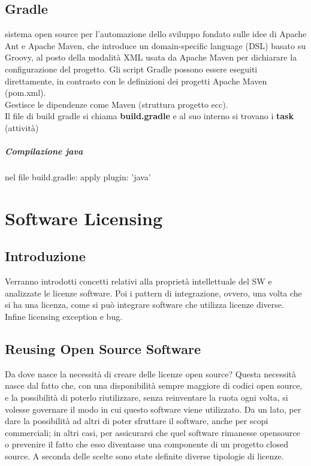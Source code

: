 \documentclass[10pt,a4paper]{book}
\begin{document}
\section{Gradle}
sistema open source per l'automazione dello sviluppo fondato sulle idee di Apache Ant e Apache Maven, che introduce un domain-specific language (DSL) basato su Groovy, al posto della modalità XML usata da Apache Maven per dichiarare la configurazione del progetto. Gli script Gradle possono essere eseguiti direttamente, in contrasto con le definizioni dei progetti Apache Maven (pom.xml).\\
Gestisce le dipendenze come Maven (struttura progetto ecc).\\
Il file di build gradle si chiama \textbf{build.gradle} e al suo interno si trovano i \textbf{task} (attività)

\paragraph{Compilazione java}
nel file build.gradle: apply plugin: 'java'



\chapter{Software Licensing}
\section{Introduzione}
Verranno introdotti concetti relativi alla proprietà intellettuale del SW e analizzate le licenze software. Poi i pattern di integrazione, ovvero, una volta che si ha una licenza, come si può integrare software che utilizza licenze diverse. Infine licensing exception e bug.

\section{Reusing Open Source Software}
Da dove nasce la necessità di creare delle licenze open source? Questa necessità nasce dal fatto che, con una disponibilità sempre maggiore di codici open source, e la possibilità di poterlo riutilizzare, senza reinventare la ruota ogni volta, si volesse governare il modo in cui questo software viene utilizzato. Da un lato, per dare la possibilità ad altri di poter sfruttare il software, anche per scopi commerciali; in altri casi, per assicurarsi che quel software rimanesse opensource o prevenire il fatto che esso diventasse una componente di un progetto closed source. A seconda delle scelte sono state definite diverse tipologie di licenze.
\end{document}
